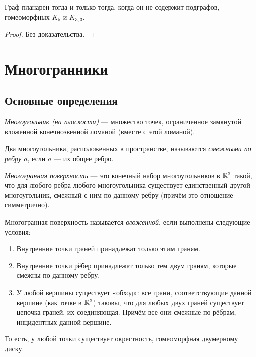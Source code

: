 \begin{theorem}
    Граф планарен тогда и только тогда, когда он не содержит подграфов, гомеоморфных $K_5$ и $K_{3,3}$.
\end{theorem}
\begin{proof}
    Без доказательства.
\end{proof}

\newpage
\section{Многогранники}
\subsection{Основные определения}
\begin{definition}
    \textit{Многоугольник (на плоскости)} — множество точек, ограниченное замкнутой вложенной конечнозвенной ломаной (вместе с этой ломаной).
\end{definition}

\begin{definition}
    Два многоугольника, расположенных в пространстве, называются \textit{смежными по ребру $a$}, если $a$ — их общее ребро. %
\end{definition}

\begin{definition}
    \textit{Многогранная поверхность} — это конечный набор многоугольников в $\mathbb{R}^3$ такой, что для любого ребра любого многоугольника существует единственный другой многоугольник, смежный с ним по данному ребру (причём это отношение симметрично).
\end{definition}

\begin{definition}
    Многогранная поверхность называется \textit{вложенной}, если выполнены следующие условия:
    \begin{enumerate}
        \item Внутренние точки граней принадлежат только этим граням.
        \item Внутренние точки рёбер принадлежат только тем двум граням, которые смежны по данному ребру.
        \item У любой вершины существует «обход»: все грани, соответствующие данной вершине (как точке в $\mathbb{R}^3$) таковы, что для любых двух граней существует цепочка граней, их соединяющая. Причём все они смежные по рёбрам, инцидентных данной вершине.
    \end{enumerate}
    То есть, у любой точки существует окрестность, гомеоморфная двумерному диску.
\end{definition}

